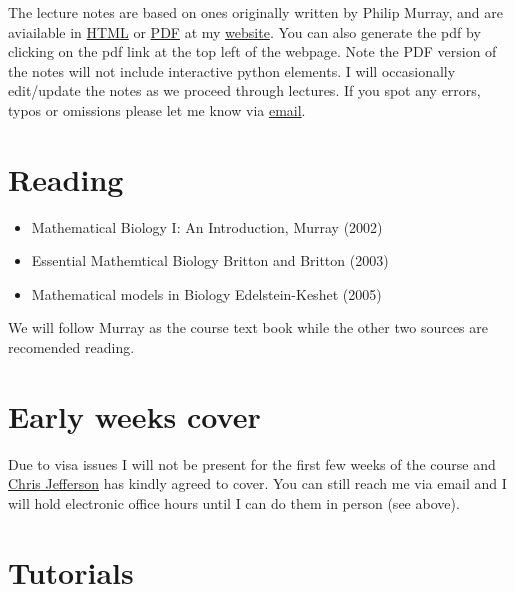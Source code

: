 \documentclass[
  letterpaper,
  DIV=11,
  numbers=noendperiod]{scrreprt}
\providecommand{\tightlist}{%
  \setlength{\itemsep}{0pt}\setlength{\parskip}{0pt}}
\begin{document}

The lecture notes are based on ones originally written by Philip Murray,
and are aviailable in \href{www.twinyard.co.uk/DI32011}{HTML} or
\href{www.twinyard.co.uk/DI32011/docs/DI32011.pdf}{PDF} at my
\href{www.twinyard.co.uk}{website}. You can also generate the pdf by
clicking on the pdf link at the top left of the webpage. Note the PDF
version of the notes will not include interactive python elements. I
will occasionally edit/update the notes as we proceed through lectures.
If you spot any errors, typos or omissions please let me know via
\href{mailto:twinyard001@dundee.ac.uk}{email}.

\section*{Reading}\label{reading}


\begin{itemize}
\tightlist
\item
  Mathematical Biology I: An Introduction, Murray (2002)
\item
  Essential Mathemtical Biology Britton and Britton (2003)
\item
  Mathematical models in Biology Edelstein-Keshet (2005)
\end{itemize}

We will follow Murray as the course text book while the other two
sources are recomended reading.

\section*{Early weeks cover}\label{early-weeks-cover}


Due to visa issues I will not be present for the first few weeks of the
course and \href{mailto:CJefferson001@dundee.ac.uk}{Chris Jefferson} has
kindly agreed to cover. You can still reach me via email and I will hold
electronic office hours until I can do them in person (see above).

\section*{Tutorials}\label{tutorials}
\end{document}

